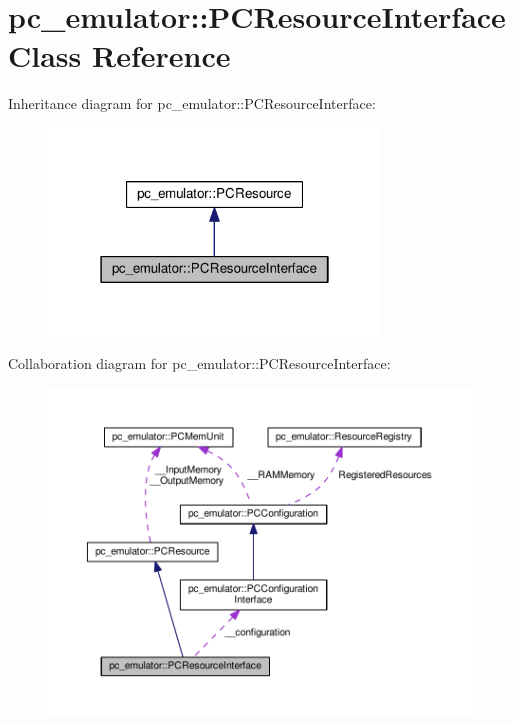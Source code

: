 \hypertarget{classpc__emulator_1_1PCResourceInterface}{}\section{pc\+\_\+emulator\+:\+:P\+C\+Resource\+Interface Class Reference}
\label{classpc__emulator_1_1PCResourceInterface}


Inheritance diagram for pc\+\_\+emulator\+:\+:P\+C\+Resource\+Interface\+:
\nopagebreak
\begin{figure}[H]
\begin{center}
\leavevmode
\includegraphics[width=250pt]{classpc__emulator_1_1PCResourceInterface__inherit__graph}
\end{center}
\end{figure}


Collaboration diagram for pc\+\_\+emulator\+:\+:P\+C\+Resource\+Interface\+:
\nopagebreak
\begin{figure}[H]
\begin{center}
\leavevmode
\includegraphics[width=350pt]{classpc__emulator_1_1PCResourceInterface__coll__graph}
\end{center}
\end{figure}
